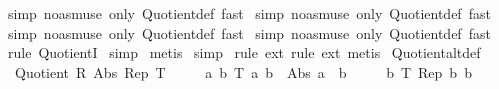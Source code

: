 \begin{isabellebody}
\isamarkupfalse%
\ {\isacharparenleft}{\kern0pt}simp\ {\isacharparenleft}{\kern0pt}no{\isacharunderscore}{\kern0pt}asm{\isacharunderscore}{\kern0pt}use{\isacharparenright}{\kern0pt}\ only{\isacharcolon}{\kern0pt}\ Quotient{\isacharunderscore}{\kern0pt}def{\isacharcomma}{\kern0pt}\ fast{\isacharparenright}{\kern0pt}\isanewline
{}\isamarkupfalse%
\ {\isacharparenleft}{\kern0pt}simp\ {\isacharparenleft}{\kern0pt}no{\isacharunderscore}{\kern0pt}asm{\isacharunderscore}{\kern0pt}use{\isacharparenright}{\kern0pt}\ only{\isacharcolon}{\kern0pt}\ Quotient{\isacharunderscore}{\kern0pt}def{\isacharcomma}{\kern0pt}\ fast{\isacharparenright}{\kern0pt}\isanewline
{}\isamarkupfalse%
\ {\isacharparenleft}{\kern0pt}simp\ {\isacharparenleft}{\kern0pt}no{\isacharunderscore}{\kern0pt}asm{\isacharunderscore}{\kern0pt}use{\isacharparenright}{\kern0pt}\ only{\isacharcolon}{\kern0pt}\ Quotient{\isacharunderscore}{\kern0pt}def{\isacharcomma}{\kern0pt}\ fast{\isacharparenright}{\kern0pt}\isanewline
{}\isamarkupfalse%
\ {\isacharparenleft}{\kern0pt}simp\ {\isacharparenleft}{\kern0pt}no{\isacharunderscore}{\kern0pt}asm{\isacharunderscore}{\kern0pt}use{\isacharparenright}{\kern0pt}\ only{\isacharcolon}{\kern0pt}\ Quotient{\isacharunderscore}{\kern0pt}def{\isacharcomma}{\kern0pt}\ fast{\isacharparenright}{\kern0pt}\isanewline
{}\isamarkupfalse%
\ {\isacharparenleft}{\kern0pt}rule\ QuotientI{\isacharparenright}{\kern0pt}\isanewline
{}\isamarkupfalse%
\ simp\isanewline
{}\isamarkupfalse%
\ metis\isanewline
{}\isamarkupfalse%
\ simp\isanewline
{}\isamarkupfalse%
\ {\isacharparenleft}{\kern0pt}rule\ ext{\isacharcomma}{\kern0pt}\ rule\ ext{\isacharcomma}{\kern0pt}\ metis{\isacharparenright}{\kern0pt}\isanewline
{}\isamarkupfalse%
%
\endisatagproof
{\isafoldproof}%
%
\isadelimproof
\isanewline
%
\endisadelimproof
\isanewline
{}\isamarkupfalse%
\ Quotient{\isacharunderscore}{\kern0pt}alt{\isacharunderscore}{\kern0pt}def{}{\isacharcolon}{\kern0pt}\isanewline
\ \ {\isachardoublequoteopen}Quotient\ R\ Abs\ Rep\ T\ {\isasymlongleftrightarrow}\isanewline
\ \ \ \ {\isacharparenleft}{\kern0pt}{\isasymforall}a\ b{\isachardot}{\kern0pt}\ T\ a\ b\ {\isasymlongrightarrow}\ Abs\ a\ {\isacharequal}{\kern0pt}\ b{\isacharparenright}{\kern0pt}\ {\isasymand}\isanewline
\ \ \ \ {\isacharparenleft}{\kern0pt}{\isasymforall}b{\isachardot}{\kern0pt}\ T\ {\isacharparenleft}{\kern0pt}Rep\ b{\isacharparenright}{\kern0pt}\ b{\isacharparenright}{\kern0pt}\ {\isasymand}\isanewline

\end{isabellebody}
